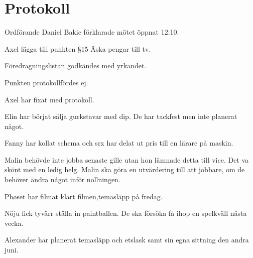 \documentclass[10pt]{article}
\def\mo{Daniel Bakic}
\begin{document}
\section*{Protokoll}
\begin{paragrafer}
	Ordförande {\mo} förklarade mötet öppnat 12:10.
	
	{\valavmo}
	
	{\valavms}
	
	{\valavj}
	
	{\tosg}
	
	{\ingaadj}
	
	
	Axel \ypa lägga till punkten \S15 Äska pengar till tv.
	
	Föredragningslistan godkändes med yrkandet.
	
	
	\begin{fyllnadsval} %
	\end{fyllnadsval}
	
	\begin{paragrafer}
		Punkten protokollfördes ej.
		
		
		Axel har fixat med protokoll.

		Elin har börjat sälja gurkstavar med dip. De har tackfest men inte planerat något.

		Fanny har kollat schema och srx har delat ut pris till en lärare på maskin.

		Malin behövde inte jobba senaste gille utan hon lämnade detta till vice. Det va skönt med en ledig helg. Malin ska göra en utvärdering till att jobbare, om de behöver ändra något inför nollningen. 

		Phøset har filmat klart filmen,temasläpp på fredag.

		Nöju fick tyvärr ställa in paintballen. De ska försöka få ihop en spelkväll nästa vecka. 

		Alexander har planerat temasläpp och etslask samt sin egna sittning den andra juni. 


\end{paragrafer}
\end{paragrafer}
\end{document}
